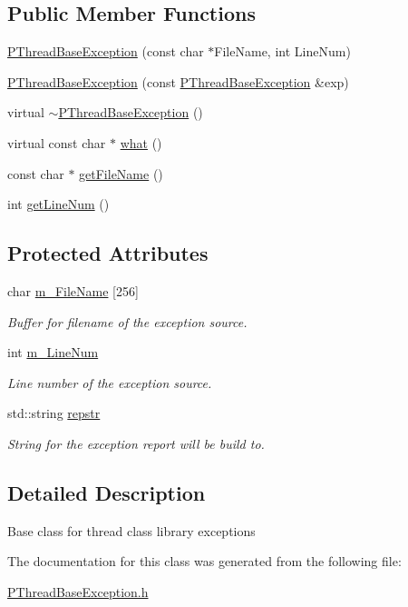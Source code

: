 \subsection*{Public Member Functions}
\begin{DoxyCompactItemize}
\item 
\hyperlink{group__EXCEPT__GROUP_ga479c992ccbf4a39cd707a27906925601}{P\+Thread\+Base\+Exception} (const char $\ast$File\+Name, int Line\+Num)
\item 
\hyperlink{group__EXCEPT__GROUP_gaf6dded31d5ab6283d588f99a702241ec}{P\+Thread\+Base\+Exception} (const \hyperlink{classPThreadBaseException}{P\+Thread\+Base\+Exception} \&exp)
\item 
virtual \hyperlink{group__EXCEPT__GROUP_gae4edc60cd7923ef9305a1312cdbc9fc1}{$\sim$\+P\+Thread\+Base\+Exception} ()
\item 
virtual const char $\ast$ \hyperlink{group__EXCEPT__GROUP_ga4389169c01caec3fe93ac45a5d69a9ec}{what} ()
\item 
const char $\ast$ \hyperlink{group__EXCEPT__GROUP_ga4d72952887facf12a96971e964d3427b}{get\+File\+Name} ()
\item 
int \hyperlink{group__EXCEPT__GROUP_ga7a06d992e2dbfa1d283e6c6fb209fd62}{get\+Line\+Num} ()
\end{DoxyCompactItemize}
\subsection*{Protected Attributes}
\begin{DoxyCompactItemize}
\item 
char \hyperlink{group__EXCEPT__GROUP_gace215cb27c8b35eae74d51e9a18f5bfa}{m\+\_\+\+File\+Name} \mbox{[}256\mbox{]}
\begin{DoxyCompactList}\small\item\em Buffer for filename of the exception source. \end{DoxyCompactList}\item 
int \hyperlink{group__EXCEPT__GROUP_ga14fc21c1387d9427ec22d7712c509517}{m\+\_\+\+Line\+Num}
\begin{DoxyCompactList}\small\item\em Line number of the exception source. \end{DoxyCompactList}\item 
std\+::string \hyperlink{group__EXCEPT__GROUP_ga13ce50b63f814e93fc17c484fc28fcd6}{repstr}
\begin{DoxyCompactList}\small\item\em String for the exception report will be build to. \end{DoxyCompactList}\end{DoxyCompactItemize}


\subsection{Detailed Description}
Base class for thread class library exceptions 

The documentation for this class was generated from the following file\+:\begin{DoxyCompactItemize}
\item 
\hyperlink{PThreadBaseException_8h}{P\+Thread\+Base\+Exception.\+h}\end{DoxyCompactItemize}
